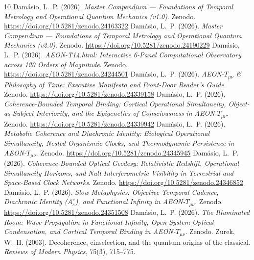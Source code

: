 \documentclass[11pt,a4paper]{article}
\begin{document}
\begin{thebibliography}{10}
 Dam\'asio, L.~P. (2026). \emph{Master Compendium --- Foundations of Temporal Metrology and Operational Quantum Mechanics (v1.0)}. Zenodo. \url{https://doi.org/10.5281/zenodo.24163322}
 Dam\'asio, L.~P. (2026). \emph{Master Compendium --- Foundations of Temporal Metrology and Operational Quantum Mechanics (v2.0)}. Zenodo. \url{https://doi.org/10.5281/zenodo.24190229}
 Dam\'asio, L.~P. (2026). \emph{AEON-T14.html: Interactive 6-Panel Computational Observatory across 120 Orders of Magnitude}. Zenodo. \url{https://doi.org/10.5281/zenodo.24244501}
 Dam\'asio, L.~P. (2026). \emph{AEON-$T_{\mu\nu}$ \& Philosophy of Time: Executive Manifesto and Front-Door Reader's Guide}. Zenodo. \url{https://doi.org/10.5281/zenodo.24339158}
 Dam\'asio, L.~P. (2026). \emph{Coherence-Bounded Temporal Binding: Cortical Operational Simultaneity, Object-as-Subject Interiority, and the Epigenetics of Consciousness in AEON-$T_{\mu\nu}$}. Zenodo. \url{https://doi.org/10.5281/zenodo.24339942}
 Dam\'asio, L.~P. (2026). \emph{Metabolic Coherence and Diachronic Identity: Biological Operational Simultaneity, Nested Organismic Clocks, and Thermodynamic Persistence in AEON-$T_{\mu\nu}$}. Zenodo. \url{https://doi.org/10.5281/zenodo.24345945}
 Dam\'asio, L.~P. (2026). \emph{Coherence-Bounded Optical Geodesy: Relativistic Redshift, Operational Simultaneity Horizons, and Null Interferometric Visibility in Terrestrial and Space-Based Clock Networks}. Zenodo. \url{https://doi.org/10.5281/zenodo.24346852}
 Dam\'asio, L.~P. (2026). \emph{Slow Metaphysics: Objective Temporal Cadence, Diachronic Identity ($A_s^v$), and Functional Infinity in AEON-$T_{\mu\nu}$}. Zenodo. \url{https://doi.org/10.5281/zenodo.24351508}
 Dam\'asio, L.~P. (2026). \emph{The Illuminated Room: Wave Propagation in Functional Infinity, Open-System Optical Condensation, and Cortical Temporal Binding in AEON-$T_{\mu\nu}$}. Zenodo.
 Zurek, W.~H. (2003). Decoherence, einselection, and the quantum origins of the classical. \emph{Reviews of Modern Physics}, 75(3), 715--775.
\end{thebibliography}
\end{document}
